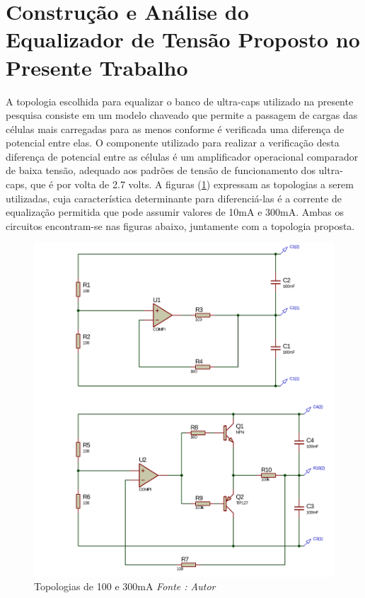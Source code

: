 \documentclass[11pt, a4paper, oneside]{article}
\begin{document}
\section{Construção e Análise do Equalizador de Tensão Proposto no Presente Trabalho}
A topologia escolhida para equalizar o banco de ultra-caps utilizado na
presente pesquisa consiste em um modelo chaveado que permite a passagem de
cargas das células mais carregadas para as menos conforme é verificada uma
diferença de potencial entre elas. O componente utilizado para realizar a
verificação desta diferença de potencial entre as células é um amplificador
operacional comparador de baixa tensão, adequado aos padrões de tensão de
funcionamento dos ultra-caps, que é por volta de 2.7 volts. A figuras (\ref{fig:topologia_dos_equlizadores_utilizados_no_presente_trabalho})
expressam as topologias a serem utilizadas, cuja característica determinante
para diferenciá-las é a corrente de equalização permitida que pode assumir valores
de 10mA e 300mA. Ambas os circuitos encontram-se nas figuras abaixo,
juntamente com a topologia proposta.

\begin{figure}[h!]
\centering
\includegraphics[width=0.9\linewidth]{topologias_equalizadoras_de_100e_10ma}
\caption{Topologias de 100 e 300mA \textit{Fonte : Autor}}
\label{fig:topologia_dos_equlizadores_utilizados_no_presente_trabalho}
\end{figure}
\end{document}
